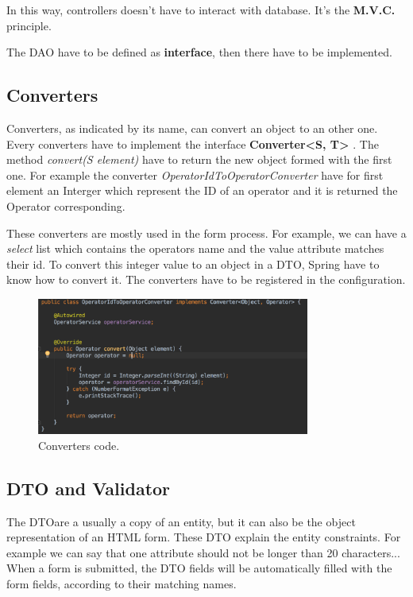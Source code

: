 In this way, controllers doesn't have to interact with database. It's the \textbf{M.V.C.} principle.

The DAO have to be defined as \textbf{interface}, then there have to be implemented.



\subsection{Converters}

Converters, as indicated by its name, can convert an object to an other one. Every converters have to implement the interface  \textbf{Converter<S, T>} . The method \textit{convert(S element)} have to return the new object formed with the first one. For example the converter \textit{OperatorIdToOperatorConverter} have for first element an Interger which represent the ID of an operator and it is returned the Operator corresponding. 

These converters are mostly used in the form process. For example, we can have a \textit{select} list which contains the operators name and the value attribute matches their id. To convert this integer value to an object in a DTO, Spring have to know how to convert it. The converters have to be registered in the configuration.

\begin{figure}[H]
  \caption{Converters code.}
  \centering
    \includegraphics[width=0.8\textwidth]{img/converter.png}
\end{figure}



\subsection{DTO and Validator}

The DTO\footnotemark are a usually a copy of an entity, but it can also be the object representation of an HTML form. These DTO explain the entity constraints. For example we can say that one attribute should not be longer than 20 characters... 
When a form is submitted, the DTO fields will be automatically filled with the form fields, according to their matching names. 
\linebreak

